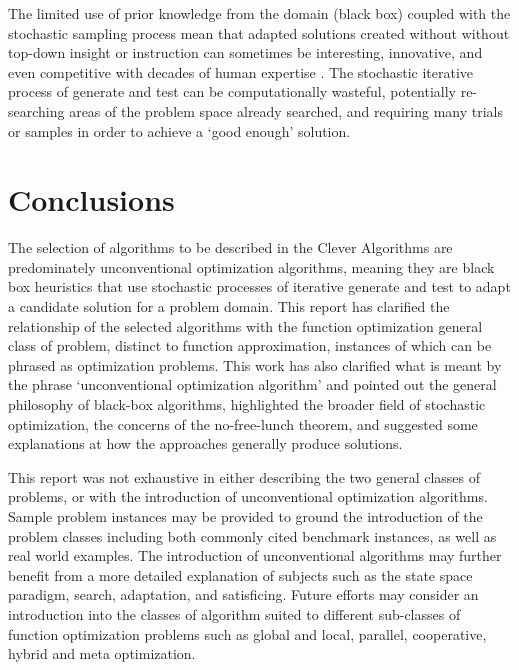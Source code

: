 \documentclass[a4paper, 11pt]{article}
\begin{document}
The limited use of prior knowledge from the domain (black box) coupled with the stochastic sampling process mean that adapted solutions created without without top-down insight or instruction can sometimes be interesting, innovative, and even competitive with decades of human expertise \cite{Koza2003}. The stochastic iterative process of generate and test can be computationally wasteful, potentially re-searching areas of the problem space already searched, and requiring many trials or samples in order to achieve a `good enough' solution.

% 
% 
\section{Conclusions}
\label{sec:conclusions}
The selection of algorithms to be described in the Clever Algorithms are predominately unconventional optimization algorithms, meaning they are black box heuristics that use stochastic processes of iterative generate and test to adapt a candidate solution for a problem domain.
This report has clarified the relationship of the selected algorithms with the function optimization general class of problem, distinct to function approximation, instances of which can be phrased as optimization problems. This work has also clarified what is meant by the phrase `unconventional optimization algorithm' and pointed out the general philosophy of black-box algorithms, highlighted the broader field of stochastic optimization, the concerns of the no-free-lunch theorem, and suggested some explanations at how the approaches generally produce solutions.

This report was not exhaustive in either describing the two general classes of problems, or with the introduction of unconventional optimization algorithms. 
Sample problem instances may be provided to ground the introduction of the problem classes including both commonly cited benchmark instances, as well as real world examples.
The introduction of unconventional algorithms may further benefit from a more detailed explanation of subjects such as the state space paradigm, search, adaptation, and satisficing. Future efforts may consider an introduction into the classes of algorithm suited to different sub-classes of function optimization problems such as global and local, parallel, cooperative, hybrid and meta optimization.



\end{document}
